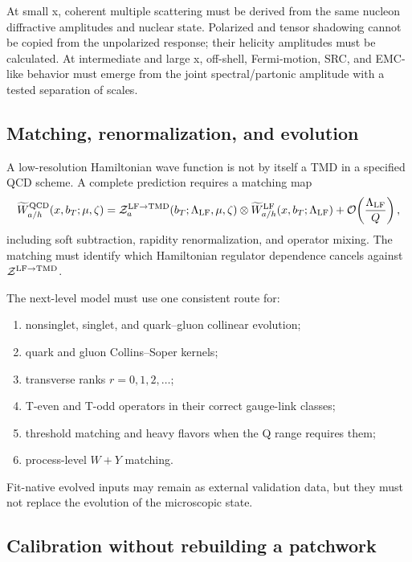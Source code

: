 \documentclass[11pt]{article}
\begin{document}
At small x, coherent multiple scattering must be derived from the same
nucleon diffractive amplitudes and nuclear state.  Polarized and tensor
shadowing cannot be copied from the unpolarized response; their helicity
amplitudes must be calculated.  At intermediate and large x, off-shell,
Fermi-motion, SRC, and EMC-like behavior must emerge from the joint
spectral/partonic amplitude with a tested separation of scales.

\subsection{Matching, renormalization, and evolution}

A low-resolution Hamiltonian wave function is not by itself a TMD in a
specified QCD scheme.  A complete prediction requires a matching map
\begin{equation}
\widetilde W^{\rm QCD}_{a/h}
(x,b_T;\mu,\zeta)
=\mathcal Z_{a}^{\rm LF\to TMD}
(b_T;\Lambda_{\rm LF},\mu,\zeta)
\otimes
\widetilde W^{\rm LF}_{a/h}
(x,b_T;\Lambda_{\rm LF})
+\mathcal O\!\left(\frac{\Lambda_{\rm LF}}{Q}\right),
\label{eq:lf-matching}
\end{equation}
including soft subtraction, rapidity renormalization, and operator mixing.
The matching must identify which Hamiltonian regulator dependence cancels
against \(\mathcal Z^{\rm LF\to TMD}\).

The next-level model must use one consistent route for:
\begin{enumerate}
  \item nonsinglet, singlet, and quark--gluon collinear evolution;
  \item quark and gluon Collins--Soper kernels;
  \item transverse ranks \(r=0,1,2,\ldots\);
  \item T-even and T-odd operators in their correct gauge-link classes;
  \item threshold matching and heavy flavors when the Q range requires them;
  \item process-level \(W+Y\) matching.
\end{enumerate}
Fit-native evolved inputs may remain as external validation data, but they
must not replace the evolution of the microscopic state.

\subsection{Calibration without rebuilding a patchwork}
\end{document}
